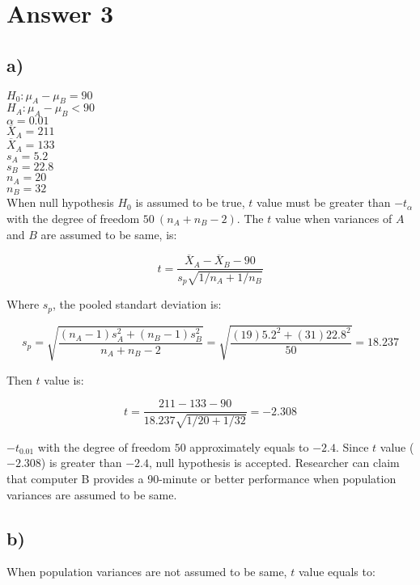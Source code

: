 \documentclass[12pt]{article}
\begin{document}
\section*{Answer 3}
\subsection*{a)}
$H_0: \mu_A - \mu_B = 90$\\
$H_A: \mu_A - \mu_B < 90$\\
$\alpha = 0.01$\\
$\overline{X}_A = 211$\\
$\overline{X}_A = 133$\\
$s_A= 5.2$\\
$s_B = 22.8$\\
$n_A = 20$\\
$n_B = 32$\\

When null hypothesis $H_0$ is assumed to be true, $t$ value must be greater than $-t_{\alpha}$ with the degree of freedom $50 \ (n_A + n_B - 2)$. The $t$ value when variances of $A$ and $B$ are assumed to be same, is:

\begin{equation*}
	t = \frac{ \overline{X}_A - \overline{X}_B - 90}{s_p \sqrt{1/n_A + 1/n_B}}
\end{equation*}

Where $s_p$, the pooled standart deviation is:

\begin{equation*}
	s_p = \sqrt{\frac{(n_A - 1)s_A^2 + (n_B - 1)s_B^2}{n_A + n_B - 2}} =  \sqrt{\frac{(19)5.2^2 + (31)22.8^2}{50}} = 18.237
\end{equation*}

Then $t$ value is:

\begin{equation*}
		t = \frac{ 211 - 133 - 90}{18.237 \sqrt{1/20 + 1/32}} = -2.308
\end{equation*}

$-t_{0.01}$ with the degree of freedom $50$ approximately equals to $-2.4$. Since $t$ value ($-2.308$) is greater than $-2.4$, null hypothesis is accepted. Researcher can claim that computer B provides a 90-minute or better performance when population variances are assumed to be same.

\subsection*{b)}
When population variances are not assumed to be same, $t$ value equals to:
\end{document}
